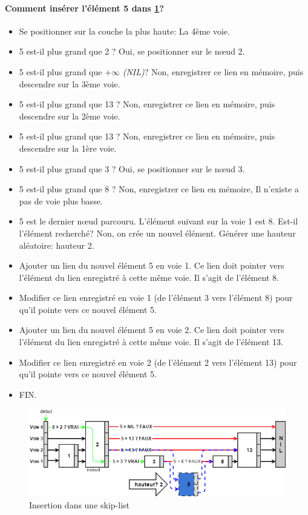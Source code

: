 \documentclass[hidelinks,a4paper, 12pt]{article}
\begin{document}
	\paragraph*{Comment insérer l'élément 5 dans \cref{SkipInsert2}?}
	\begin{itemize}
		\item Se positionner sur la couche la plus haute: La 4ème voie.
		\item 5 est-il plus grand que 2 ? Oui, se positionner sur le nœud 2.
		\item 5 est-il plus grand que $+\infty$ \textit{(NIL)}? Non, enregistrer ce lien en mémoire, puis descendre sur la 3ème voie.
		\item 5 est-il plus grand que 13 ? Non, enregistrer ce lien en mémoire, puis descendre sur la 2ème voie.
		\item 5 est-il plus grand que 13 ? Non, enregistrer ce lien en mémoire, puis descendre sur la 1ère voie.
		\item 5 est-il plus grand que 3 ? Oui, se positionner sur le nœud 3.
		\item 5 est-il plus grand que 8 ? Non, enregistrer ce lien en mémoire, Il n'existe a pas de voie plus basse.
		\item 5 est le dernier nœud parcouru. L'élément suivant sur la voie 1 est 8. Est-il l'élément recherché? Non, on crée un nouvel élément. Générer une hauteur aléatoire: hauteur 2.
		\item Ajouter un lien du nouvel élément 5 en voie 1. Ce lien doit pointer vers l'élément du lien enregistré à cette même voie. Il s'agit de l'élément 8.
		\item Modifier ce lien enregistré en voie 1 (de l'élément 3 vers l'élément 8) pour qu'il pointe vers ce nouvel élément 5.
		\item Ajouter un lien du nouvel élément 5 en voie 2. Ce lien doit pointer vers l'élément du lien enregistré à cette même voie. Il s'agit de l'élément 13.
		\item Modifier ce lien enregistré en voie 2 (de l'élément 2 vers l'élément 13) pour qu'il pointe vers ce nouvel élément 5.
		\item FIN.
	\end{itemize}
	\begin{figure}[h]
		\includegraphics[width=\textwidth]{img/insert2}
		\caption{Insertion dans une skip-list}
		\label{SkipInsert2}
	\end{figure}
	
\end{document}
